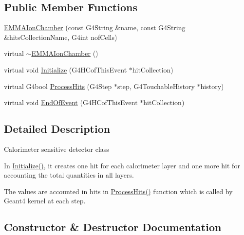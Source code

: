 \subsection*{Public Member Functions}
\begin{DoxyCompactItemize}
\item 
\hyperlink{classEMMAIonChamber_a8972e800fbf5dce95809f5b876149af8}{E\+M\+M\+A\+Ion\+Chamber} (const G4\+String \&name, const G4\+String \&hits\+Collection\+Name, G4int nof\+Cells)
\item 
virtual \hyperlink{classEMMAIonChamber_a7113083473fee442b1df1c8393df5c90}{$\sim$\+E\+M\+M\+A\+Ion\+Chamber} ()
\item 
virtual void \hyperlink{classEMMAIonChamber_a3d9455e5e2cbb09b58ae88d1cd57a200}{Initialize} (G4\+H\+Cof\+This\+Event $\ast$hit\+Collection)
\item 
virtual G4bool \hyperlink{classEMMAIonChamber_ab0d46e67d9421ac3a165c1e697f8c564}{Process\+Hits} (G4\+Step $\ast$step, G4\+Touchable\+History $\ast$history)
\item 
virtual void \hyperlink{classEMMAIonChamber_a0342f4d809c2c309534fd6b6ce985687}{End\+Of\+Event} (G4\+H\+Cof\+This\+Event $\ast$hit\+Collection)
\end{DoxyCompactItemize}


\subsection{Detailed Description}
Calorimeter sensitive detector class

In \hyperlink{classEMMAIonChamber_a3d9455e5e2cbb09b58ae88d1cd57a200}{Initialize()}, it creates one hit for each calorimeter layer and one more hit for accounting the total quantities in all layers.

The values are accounted in hits in \hyperlink{classEMMAIonChamber_ab0d46e67d9421ac3a165c1e697f8c564}{Process\+Hits()} function which is called by Geant4 kernel at each step. 

\subsection{Constructor \& Destructor Documentation}
